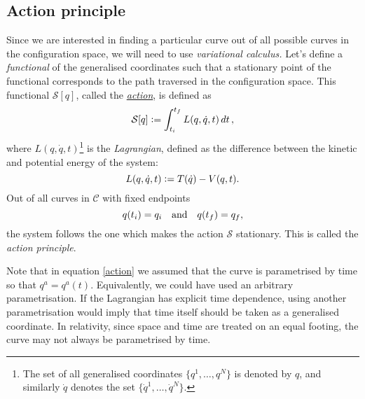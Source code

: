 \documentclass{article}
\begin{document}
\subsection{Action principle}
Since we are interested in finding a particular curve out of all possible curves in the configuration space, we will need to use \textit{variational calculus.} Let's define a \textit{functional} of the generalised coordinates such that a stationary point of the functional corresponds to the path traversed in the configuration space. This functional $\mathcal{S}[q]$, called the \href{https://en.wikipedia.org/wiki/Action_(physics)}{\textit{action}}, is defined as
\begin{equation} \label{action}
    \mathcal{S}[q] \vcentcolon= \int_{t_i}^{t_f} L(q,\dot{q},t) \dd{t},
\end{equation}
where $L(q,\dot{q},t)$\footnote{The set of all generalised coordinates $\{q^1, \dots, q^N\}$ is denoted by $q$, and similarly $\dot{q}$ denotes the set $\{\dot{q}^1,\dots,\dot{q}^N\}$.} is the \textit{Lagrangian}, defined as the difference between the kinetic and potential energy of the system:
\begin{equation}
    L(q,\dot{q},t) \vcentcolon= T(\dot{q}) - V(q,t).
\end{equation}
Out of all curves in $\mathcal{C}$ with fixed endpoints
\begin{equation}\label{variationboundary}
    q(t_i) = q_{i} \qq{and} q(t_f) = q_{f},
\end{equation}
the system follows the one which makes the action $\mathcal{S}$ stationary. This is called the \textit{action principle}.
\par
Note that in equation \eqref{action} we assumed that the curve is parametrised by time so that $q^a = q^a(t)$. Equivalently, we could have used an arbitrary parametrisation. If the Lagrangian has explicit time dependence, using another parametrisation would imply that time itself should be taken as a generalised coordinate. In relativity, since space and time are treated on an equal footing, the curve may not always be parametrised by time.
\end{document}

